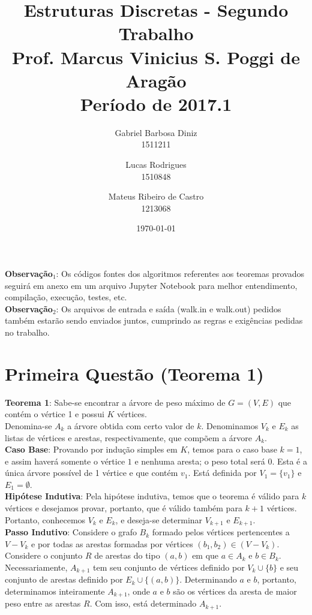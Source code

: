 \documentclass{article}
\title{%
  Estruturas Discretas - Segundo Trabalho\\
  \large Prof. Marcus Vinicius S. Poggi de Aragão\\
  Período de 2017.1}
\author{Gabriel Barbosa Diniz\\1511211 \and Lucas Rodrigues\\1510848 \and Mateus Ribeiro de Castro\\1213068}
\date{\today}
\begin{document}
\maketitle

\textbf{Observação$_1$}: Os códigos fontes dos algoritmos referentes aos teoremas provados seguirá em anexo em um arquivo Jupyter Notebook para melhor entendimento, compilação, execução, testes, etc.\\

\textbf{Observação$_2$}: Os arquivos de entrada e saída (walk.in e walk.out) pedidos também estarão sendo enviados juntos, cumprindo as regras e exigências pedidas no trabalho.

\section{Primeira Questão (Teorema 1)}

\textbf{Teorema 1}: Sabe-se encontrar a árvore de peso máximo de $G=(V,E)$ que contém o vértice 1 e possui $K$ vértices.\\

Denomina-se $A_k$ a árvore obtida com certo valor de $k$. Denominamos $V_k$ e $E_k$ as listas de vértices e arestas, respectivamente, que compõem a árvore $A_k$.\\

\textbf{Caso Base}: Provando por indução simples em $K$, temos para o caso base $k=1$, e assim haverá somente o vértice $1$ e nenhuma aresta; o peso total será $0$. Esta é a única árvore possível de 1 vértice e que contém $v_1$. Está definida por $V_1 = \{v_1\}$ e $E_1 = \emptyset$.\\

\textbf{Hipótese Indutiva}: Pela hipótese indutiva, temos que o teorema é válido para $k$ vértices e desejamos provar, portanto, que é válido também para $k+1$ vértices. Portanto, conhecemos $V_k$ e $E_k$, e deseja-se determinar $V_{k+1}$ e $E_{k+1}$.\\

\textbf{Passo Indutivo}: Considere o grafo $B_k$ formado pelos vértices pertencentes a $V - V_k$ e por todas as arestas formadas por vértices $(b_1, b_2) \in (V - V_k)$. Considere o conjunto $R$ de arestas do tipo $(a, b)$ em que $a \in A_k$ e $b \in B_k$. Necessariamente, $A_{k+1}$ tem seu conjunto de vértices definido por $V_k \cup \{b\}$ e seu conjunto de arestas definido por $E_k \cup \{(a, b)\}$. Determinando $a$ e $b$, portanto, determinamos inteiramente $A_{k+1}$, onde $a$ e $b$ são os vértices da aresta de maior peso entre as arestas $R$. Com isso, está determinado $A_{k+1}$.\\
\end{document}
